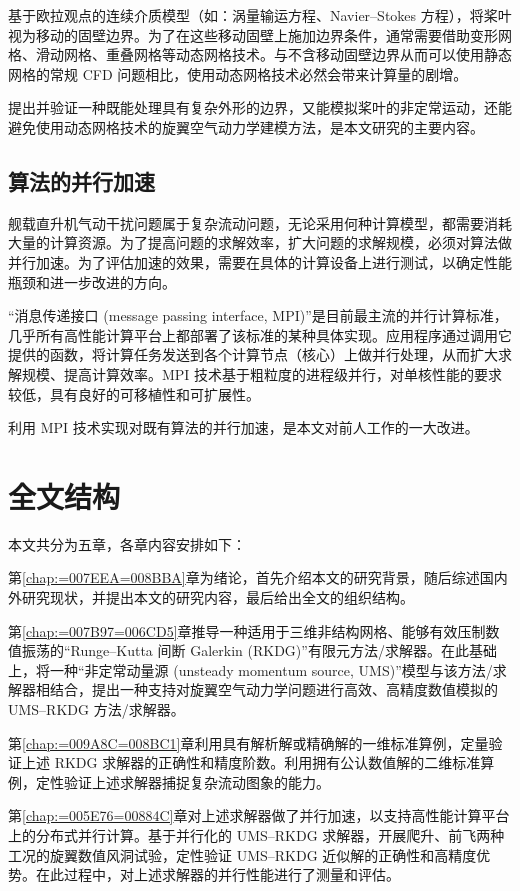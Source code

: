 基于欧拉观点的连续介质模型（如：涡量输运方程、Navier–Stokes 方程），将桨叶视为移动的固壁边界。为了在这些移动固壁上施加边界条件，通常需要借助变形网格、滑动网格、重叠网格等动态网格技术。与不含移动固壁边界从而可以使用静态网格的常规
CFD 问题相比，使用动态网格技术必然会带来计算量的剧增。

提出并验证一种既能处理具有复杂外形的边界，又能模拟桨叶的非定常运动，还能避免使用动态网格技术的旋翼空气动力学建模方法，是本文研究的主要内容。

\subsection{算法的并行加速}

舰载直升机气动干扰问题属于复杂流动问题，无论采用何种计算模型，都需要消耗大量的计算资源。为了提高问题的求解效率，扩大问题的求解规模，必须对算法做并行加速。为了评估加速的效果，需要在具体的计算设备上进行测试，以确定性能瓶颈和进一步改进的方向。

“消息传递接口 (message passing interface, MPI)”是目前最主流的并行计算标准，几乎所有高性能计算平台上都部署了该标准的某种具体实现。应用程序通过调用它提供的函数，将计算任务发送到各个计算节点（核心）上做并行处理，从而扩大求解规模、提高计算效率。MPI
技术基于粗粒度的进程级并行，对单核性能的要求较低，具有良好的可移植性和可扩展性。

利用 MPI 技术实现对既有算法的并行加速，是本文对前人工作的一大改进。

\section{全文结构}

本文共分为五章，各章内容安排如下：

第\ref{chap:=007EEA=008BBA}章为绪论，首先介绍本文的研究背景，随后综述国内外研究现状，并提出本文的研究内容，最后给出全文的组织结构。

第\ref{chap:=007B97=006CD5}章推导一种适用于三维非结构网格、能够有效压制数值振荡的“Runge–Kutta
间断 Galerkin (RKDG)”有限元方法/求解器。在此基础上，将一种“非定常动量源 (unsteady momentum source,
UMS)”模型与该方法/求解器相结合，提出一种支持对旋翼空气动力学问题进行高效、高精度数值模拟的 UMS–RKDG 方法/求解器。

第\ref{chap:=009A8C=008BC1}章利用具有解析解或精确解的一维标准算例，定量验证上述 RKDG 求解器的正确性和精度阶数。利用拥有公认数值解的二维标准算例，定性验证上述求解器捕捉复杂流动图象的能力。

第\ref{chap:=005E76=00884C}章对上述求解器做了并行加速，以支持高性能计算平台上的分布式并行计算。基于并行化的
UMS–RKDG 求解器，开展爬升、前飞两种工况的旋翼数值风洞试验，定性验证 UMS–RKDG 近似解的正确性和高精度优势。在此过程中，对上述求解器的并行性能进行了测量和评估。

